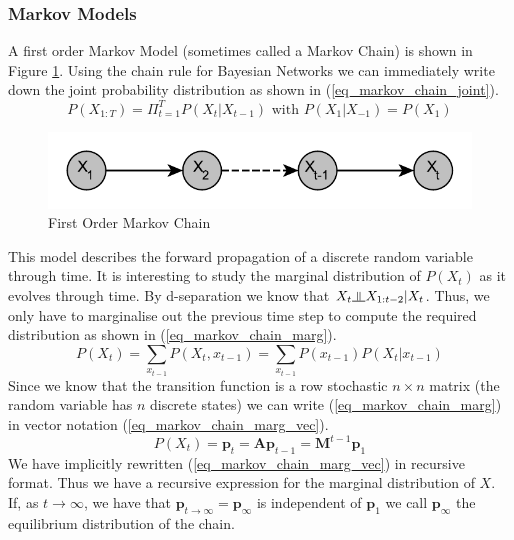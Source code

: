 \documentclass[../masters.tex]{subfiles}
\begin{document}
\subsubsection{Markov Models}
A first order Markov Model (sometimes called a Markov Chain) is shown in Figure \ref{fig_markov_chain}. Using the chain rule for Bayesian Networks we can immediately write down the joint probability distribution as shown in (\ref{eq_markov_chain_joint}).
\begin{equation}
P(X_{1:T}) = \Pi_{t=1}^T P(X_t|X_{t-1}) \text{ with } P(X_1|X_{-1}) = P(X_1)
\label{eq_markov_chain_joint}
\end{equation}  
\begin{figure}[H] 
\centering
\includegraphics[scale=1.0]{markov_chain.pdf}
\caption{First Order Markov Chain}
\label{fig_markov_chain}
\end{figure}
This model describes the forward propagation of a discrete random variable through time. It is interesting to study the marginal distribution of $P(X_t)$ as it evolves through time. By d-separation we know that $X_t \indep X_{1:t-2} | X_t$. Thus, we only have to marginalise out the previous time step to compute the required distribution as shown in (\ref{eq_markov_chain_marg}).
\begin{equation}
P(X_t) = \sum_{x_{t-1}} P(X_t, x_{t-1}) = \sum_{x_{t-1}} P(x_{t-1})P(X_t|x_{t-1})
\label{eq_markov_chain_marg}
\end{equation}
Since we know that the transition function is a row stochastic $n \times n$ matrix (the random variable has $n$ discrete states) we can write (\ref{eq_markov_chain_marg}) in vector notation (\ref{eq_markov_chain_marg_vec}).
\begin{equation}
P(X_t) = \mathbf{p}_t = \mathbf{A}\mathbf{p}_{t-1} = \mathbf{M}^{t-1}\mathbf{p}_1
\label{eq_markov_chain_marg_vec}
\end{equation}
We have implicitly rewritten (\ref{eq_markov_chain_marg_vec}) in recursive format. Thus we have a recursive expression for the marginal distribution of $X$. If, as $t \rightarrow \infty$, we have that $\mathbf{p}_{t \rightarrow \infty} = \mathbf{p}_{\infty}$ is independent of $\mathbf{p}_1$ we call $\mathbf{p}_{\infty}$ the equilibrium distribution of the chain. 
\end{document}
